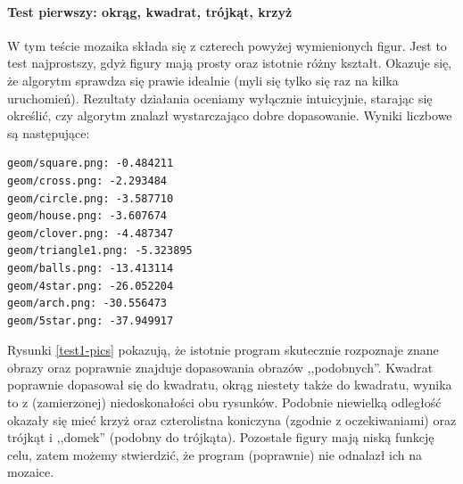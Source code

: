 \documentclass[a4paper,12pt,leqno]{article}
\begin{document}
\paragraph{Test pierwszy: okrąg, kwadrat, trójkąt, krzyż}
W tym teście mozaika składa się z czterech powyżej wymienionych figur. Jest to test najprostszy, gdyż figury mają prosty oraz istotnie różny kształt. Okazuje się, że algorytm sprawdza
się prawie idealnie (myli się tylko się raz na kilka uruchomień). Rezultaty działania oceniamy wyłącznie intuicyjnie, starając się określić, czy algorytm znalazł wystarczająco
dobre dopasowanie. Wyniki liczbowe są następujące: 
\begin{verbatim}
geom/square.png: -0.484211
geom/cross.png: -2.293484
geom/circle.png: -3.587710
geom/house.png: -3.607674
geom/clover.png: -4.487347
geom/triangle1.png: -5.323895
geom/balls.png: -13.413114
geom/4star.png: -26.052204
geom/arch.png: -30.556473
geom/5star.png: -37.949917
\end{verbatim}
Rysunki \ref{test1-pics} pokazują, że istotnie program skutecznie rozpoznaje znane obrazy oraz poprawnie znajduje dopasowania obrazów ,,podobnych''. Kwadrat poprawnie dopasował się
do kwadratu, okrąg niestety także do kwadratu, wynika to z (zamierzonej) niedoskonałości obu rysunków. Podobnie niewielką odległość okazały się mieć krzyż oraz czterolistna koniczyna
(zgodnie z oczekiwaniami) oraz trójkąt i ,,domek'' (podobny do trójkąta). Pozostałe figury mają niską funkcję celu, zatem możemy stwierdzić, że program (poprawnie) nie odnalazł ich
na mozaice.
\end{document}
